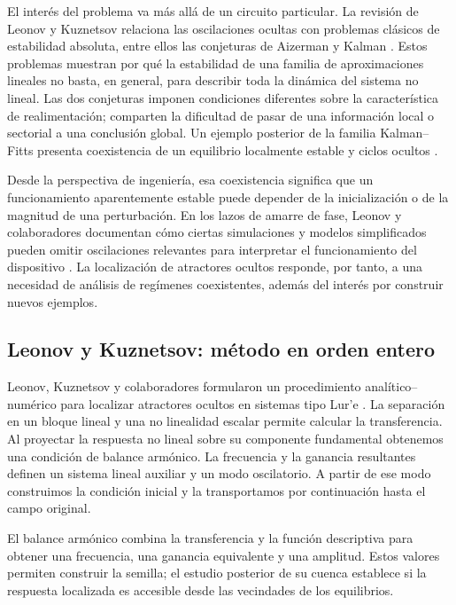 El interés del problema va más allá de un circuito particular. La revisión
de Leonov y Kuznetsov relaciona las oscilaciones ocultas con problemas
clásicos de estabilidad absoluta, entre ellos las conjeturas de Aizerman y
Kalman \cite{LeonovKuznetsov2013}. Estos problemas muestran por qué la
estabilidad de una familia de aproximaciones lineales no basta, en general,
para describir toda la dinámica del sistema no lineal. Las dos conjeturas
imponen condiciones diferentes sobre la característica de realimentación;
comparten la dificultad de pasar de una información local o sectorial a
una conclusión global. Un ejemplo posterior de la familia Kalman--Fitts
presenta coexistencia de un equilibrio localmente estable y ciclos ocultos
\cite{kalman2019}.

Desde la perspectiva de ingeniería, esa coexistencia significa que un
funcionamiento aparentemente estable puede depender de la inicialización
o de la magnitud de una perturbación. En los lazos de amarre de fase,
Leonov y colaboradores documentan cómo ciertas simulaciones y modelos
simplificados pueden omitir oscilaciones relevantes para interpretar el
funcionamiento del dispositivo \cite{pll2015}. La localización de
atractores ocultos responde, por tanto, a una necesidad de análisis de
regímenes coexistentes, además del interés por construir nuevos ejemplos.

\subsection{Leonov y Kuznetsov: método en orden entero}

Leonov, Kuznetsov y colaboradores formularon un procedimiento
analítico--numérico para localizar atractores ocultos en sistemas tipo Lur'e
\cite{LeonovKuznetsov2013,KuznetsovEtAl2017}. La separación en un bloque lineal y una no linealidad escalar permite
calcular la transferencia. Al proyectar la respuesta no lineal sobre su
componente fundamental obtenemos una condición de balance armónico. La
frecuencia y la ganancia resultantes definen un sistema lineal auxiliar y
un modo oscilatorio. A partir de ese modo construimos la condición inicial
y la transportamos por continuación hasta el campo original.

El balance armónico combina la transferencia y la función descriptiva para
obtener una frecuencia, una ganancia equivalente y una amplitud. Estos
valores permiten construir la semilla; el estudio posterior de su cuenca
establece si la respuesta localizada es accesible desde las vecindades
de los equilibrios.

